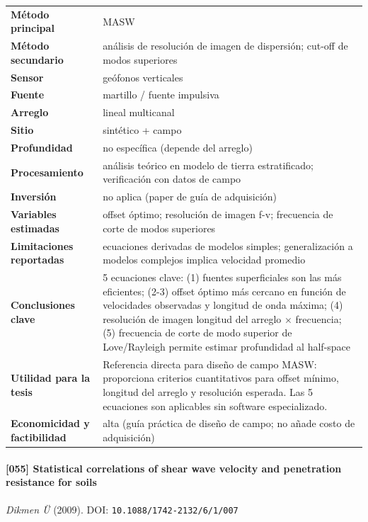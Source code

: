\begin{center}\scriptsize
\begin{tabularx}{\textwidth}{@{}>{\bfseries}p{3.3cm} X@{}}
\toprule
M\'etodo principal & MASW \\
M\'etodo secundario & análisis de resolución de imagen de dispersión; cut-off de modos superiores \\
Sensor & geófonos verticales \\
Fuente & martillo / fuente impulsiva \\
Arreglo & lineal multicanal \\
Sitio & sintético + campo \\
Profundidad & no específica (depende del arreglo) \\
Procesamiento & análisis teórico en modelo de tierra estratificado; verificación con datos de campo \\
Inversi\'on & no aplica (paper de guía de adquisición) \\
Variables estimadas & offset óptimo; resolución de imagen f-v; frecuencia de corte de modos superiores \\
Limitaciones reportadas & ecuaciones derivadas de modelos simples; generalización a modelos complejos implica velocidad promedio \\
Conclusiones clave & 5 ecuaciones clave: (1) fuentes superficiales son las más eficientes; (2-3) offset óptimo más cercano en función de velocidades observadas y longitud de onda máxima; (4) resolución de imagen  longitud del arreglo $\times$ frecuencia; (5) frecuencia de corte de modo superior de Love/Rayleigh permite estimar profundidad al half-space \\
Utilidad para la tesis & Referencia directa para diseño de campo MASW: proporciona criterios cuantitativos para offset mínimo, longitud del arreglo y resolución esperada. Las 5 ecuaciones son aplicables sin software especializado. \\
Economicidad y factibilidad & alta (guía práctica de diseño de campo; no añade costo de adquisición) \\
\bottomrule
\end{tabularx}
\end{center}

\paragraph{[055] Statistical correlations of shear wave velocity and penetration resistance for soils} \emph{Dikmen Ü} (2009).
{\scriptsize DOI: \texttt{10.1088/1742-2132/6/1/007}}

